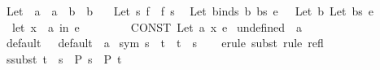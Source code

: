 \begin{isabellebody}
\isamarkupfalse%
\ Let\ {\isacharcolon}{\kern0pt}{\isacharcolon}{\kern0pt}\ {\isachardoublequoteopen}{\isacharprime}{\kern0pt}a\ {\isasymRightarrow}\ {\isacharparenleft}{\kern0pt}{\isacharprime}{\kern0pt}a\ {\isasymRightarrow}\ {\isacharprime}{\kern0pt}b{\isacharparenright}{\kern0pt}\ {\isasymRightarrow}\ {\isacharprime}{\kern0pt}b{\isachardoublequoteclose}\isanewline
\ \ \ {\isachardoublequoteopen}Let\ s\ f\ {\isasymequiv}\ f\ s{\isachardoublequoteclose}\isanewline
\isanewline
{}\isamarkupfalse%
\isanewline
\ \ {\isachardoublequoteopen}{\isacharunderscore}{\kern0pt}Let\ {\isacharparenleft}{\kern0pt}{\isacharunderscore}{\kern0pt}binds\ b\ bs{\isacharparenright}{\kern0pt}\ e{\isachardoublequoteclose}\ \ {\isasymrightleftharpoons}\ {\isachardoublequoteopen}{\isacharunderscore}{\kern0pt}Let\ b\ {\isacharparenleft}{\kern0pt}{\isacharunderscore}{\kern0pt}Let\ bs\ e{\isacharparenright}{\kern0pt}{\isachardoublequoteclose}\isanewline
\ \ {\isachardoublequoteopen}let\ x\ {\isacharequal}{\kern0pt}\ a\ in\ e{\isachardoublequoteclose}\ \ \ \ \ \ \ \ {\isasymrightleftharpoons}\ {\isachardoublequoteopen}CONST\ Let\ a\ {\isacharparenleft}{\kern0pt}{\isasymlambda}x{\isachardot}{\kern0pt}\ e{\isacharparenright}{\kern0pt}{\isachardoublequoteclose}\isanewline
\isanewline
{}\isamarkupfalse%
\ undefined\ {\isacharcolon}{\kern0pt}{\isacharcolon}{\kern0pt}\ {\isacharprime}{\kern0pt}a\isanewline
\isanewline
{}\isamarkupfalse%
\ default\ {\isacharequal}{\kern0pt}\ \ default\ {\isacharcolon}{\kern0pt}{\isacharcolon}{\kern0pt}\ {\isacharprime}{\kern0pt}a%
\isadelimdocument
%
\endisadelimdocument
%
\isatagdocument
%
\isamarkuptrue%
%
\isamarkuptrue%
%
\endisatagdocument
{\isafolddocument}%
%
\isadelimdocument
%
\endisadelimdocument
{}\isamarkupfalse%
\ sym{\isacharcolon}{\kern0pt}\ {\isachardoublequoteopen}s\ {\isacharequal}{\kern0pt}\ t\ {\isasymLongrightarrow}\ t\ {\isacharequal}{\kern0pt}\ s{\isachardoublequoteclose}\isanewline
%
\isadelimproof
\ \ %
\endisadelimproof
%
\isatagproof
{}\isamarkupfalse%
\ {\isacharparenleft}{\kern0pt}erule\ subst{\isacharparenright}{\kern0pt}\ {\isacharparenleft}{\kern0pt}rule\ refl{\isacharparenright}{\kern0pt}%
\endisatagproof
{\isafoldproof}%
%
\isadelimproof
\isanewline
%
\endisadelimproof
\isanewline
{}\isamarkupfalse%
\ ssubst{\isacharcolon}{\kern0pt}\ {\isachardoublequoteopen}t\ {\isacharequal}{\kern0pt}\ s\ {\isasymLongrightarrow}\ P\ s\ {\isasymLongrightarrow}\ P\ t{\isachardoublequoteclose}\isanewline

\end{isabellebody}

